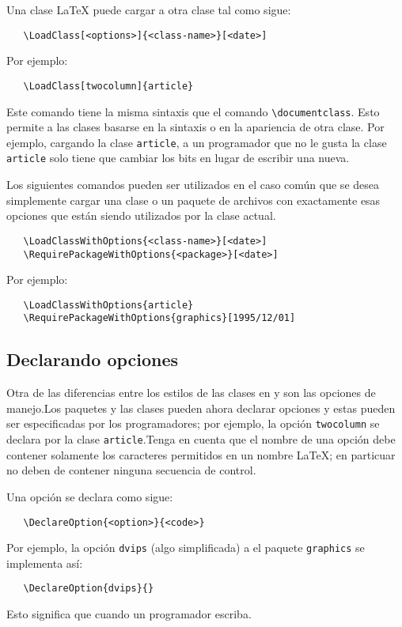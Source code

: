 Una clase \LaTeX{} puede cargar a otra clase tal como sigue:
\begin{verbatim}
   \LoadClass[<options>]{<class-name>}[<date>]
\end{verbatim}
Por ejemplo:
\begin{verbatim}
   \LoadClass[twocolumn]{article}
\end{verbatim}
Este comando tiene la misma sintaxis que el comando \verb|\documentclass|.
Esto permite a las clases basarse en la sintaxis o en la apariencia de otra clase. Por ejemplo, cargando la clase \verb|article|, a un programador que no le gusta la clase \verb|article| solo tiene que cambiar los bits en lugar de escribir una nueva.

Los siguientes comandos pueden ser utilizados en el caso común que se desea
simplemente cargar una clase o un paquete de archivos con exactamente esas opciones que
están siendo utilizados por la  clase actual.

\begin{verbatim}
   \LoadClassWithOptions{<class-name>}[<date>]
   \RequirePackageWithOptions{<package>}[<date>]
\end{verbatim}
Por ejemplo:
\begin{verbatim}
   \LoadClassWithOptions{article}
   \RequirePackageWithOptions{graphics}[1995/12/01]
\end{verbatim}

\subsection{Declarando opciones}
Otra de las diferencias entre los estilos de las clases en  \latexdos y \LaTeXe{} son las opciones de manejo.Los paquetes y las clases pueden ahora declarar opciones y estas pueden ser especificadas por los programadores; por ejemplo, la opción \verb|twocolumn| se declara por la clase \verb|article|.Tenga en cuenta que el nombre de una opción debe contener solamente los caracteres permitidos en un nombre \LaTeX{}; en particuar no deben de contener ninguna secuencia de control.

Una opción se declara como sigue:
\begin{verbatim}
   \DeclareOption{<option>}{<code>}
\end{verbatim}
Por ejemplo, la opción \verb|dvips| (algo simplificada) a el paquete \verb|graphics| se implementa así:
\begin{verbatim}
   \DeclareOption{dvips}{}
\end{verbatim}
Esto significa que cuando un programador escriba.

